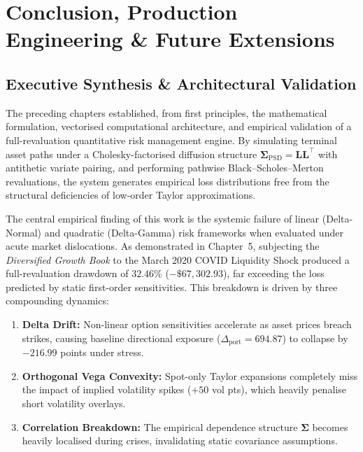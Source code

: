 \documentclass{article}
\theoremstyle{plain}
\theoremstyle{definition}
\theoremstyle{remark}
\begin{document}
\section{Conclusion, Production Engineering \& Future Extensions}

\subsection{Executive Synthesis \& Architectural Validation}
\label{sec:ch5_synthesis}
The preceding chapters established, from first principles, the mathematical formulation, vectorised computational architecture, and empirical validation of a full-revaluation quantitative risk management engine. By simulating terminal asset paths under a Cholesky-factorised diffusion structure $\mathbf{\Sigma}_{\text{PSD}} = \mathbf{L}\mathbf{L}^\top$ with antithetic variate pairing, and performing pathwise Black--Scholes--Merton revaluations, the system generates empirical loss distributions free from the structural deficiencies of low-order Taylor approximations.

The central empirical finding of this work is the systemic failure of linear (Delta-Normal) and quadratic (Delta-Gamma) risk frameworks when evaluated under acute market dislocations. As demonstrated in Chapter~5, subjecting the \textit{Diversified Growth Book} to the March 2020 COVID Liquidity Shock produced a full-revaluation drawdown of $32.46\%$ ($-\$67,302.93$), far exceeding the loss predicted by static first-order sensitivities. This breakdown is driven by three compounding dynamics:
\begin{enumerate}
    \item \textbf{Delta Drift:} Non-linear option sensitivities accelerate as asset prices breach strikes, causing baseline directional exposure ($\Delta_{\text{port}} = 694.87$) to collapse by $-216.99$ points under stress.
    \item \textbf{Orthogonal Vega Convexity:} Spot-only Taylor expansions completely miss the impact of implied volatility spikes ($+50$ vol pts), which heavily penalise short volatility overlays.
    \item \textbf{Correlation Breakdown:} The empirical dependence structure $\mathbf{\Sigma}$ becomes heavily localised during crises, invalidating static covariance assumptions.
\end{enumerate}
\end{document}

